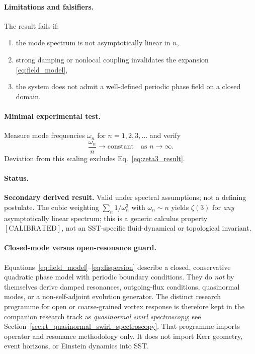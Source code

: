 \documentclass[11pt]{article}
\theoremstyle{definition}
\theoremstyle{plain}
\theoremstyle{remark}
\begin{document}
    \paragraph{Limitations and falsifiers.}
        The result fails if:
        \begin{enumerate}
            \item the mode spectrum is not asymptotically linear in $n$,
            \item strong damping or nonlocal coupling invalidates the expansion \eqref{eq:field_model},
            \item the system does not admit a well-defined periodic phase field on a closed domain.
        \end{enumerate}

    \paragraph{Minimal experimental test.}
        Measure mode frequencies $\omega_n$ for $n=1,2,3,\dots$ and verify
        \begin{equation}
            \frac{\omega_n}{n} \to \text{constant}
            \quad\text{as } n\to\infty.
        \end{equation}
        Deviation from this scaling excludes Eq.~\eqref{eq:zeta3_result}.

    \paragraph{Status.}
        \textbf{Secondary derived result.} Valid under spectral assumptions; not a defining postulate. The cubic weighting $\sum_n 1/\omega_n^3$ with $\omega_n\sim n$ yields $\zeta(3)$ for \emph{any} asymptotically linear spectrum; this is a generic calculus property $[\text{CALIBRATED}]$, not an SST-specific fluid-dynamical or topological invariant.

    \paragraph{Closed-mode versus open-resonance guard.}
        Equations~\eqref{eq:field_model}--\eqref{eq:dispersion} describe a closed,
        conservative quadratic phase model with periodic boundary conditions.  They do
        \emph{not} by themselves derive damped resonances, outgoing-flux conditions,
        quasinormal modes, or a non-self-adjoint evolution generator.  The distinct
        research programme for open or coarse-grained vortex response is therefore kept
        in the companion research track as
        \emph{quasinormal swirl spectroscopy}; see
        Section~\ref{sec:rt_quasinormal_swirl_spectroscopy}.  That programme imports
        operator and resonance methodology only.  It does not import Kerr geometry,
        event horizons, or Einstein dynamics into SST.
\end{document}
